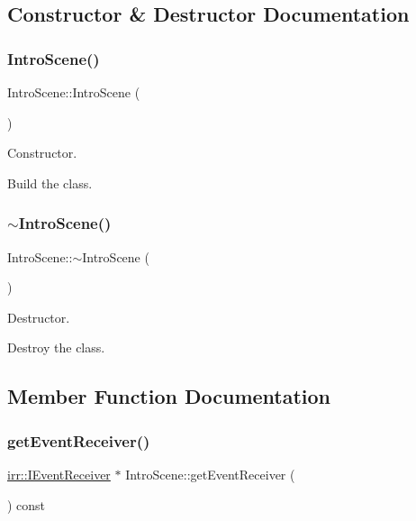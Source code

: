 \subsection{Constructor \& Destructor Documentation}
\mbox{\label{classIntroScene_a3691b51409f65b40f0c84008e49ef32b}} 
\subsubsection{\texorpdfstring{Intro\+Scene()}{IntroScene()}}
{\footnotesize\ttfamily Intro\+Scene\+::\+Intro\+Scene (\begin{DoxyParamCaption}{ }\end{DoxyParamCaption})}



Constructor. 

Build the class. \mbox{\label{classIntroScene_a7cdb50b55c0f5cf66b7bd151e4abe2b1}} 
\subsubsection{\texorpdfstring{$\sim$\+Intro\+Scene()}{~IntroScene()}}
{\footnotesize\ttfamily Intro\+Scene\+::$\sim$\+Intro\+Scene (\begin{DoxyParamCaption}{ }\end{DoxyParamCaption})}



Destructor. 

Destroy the class. 

\subsection{Member Function Documentation}
\mbox{\label{classIntroScene_acabf925dab7b2a346edd398445cd5800}} 
\subsubsection{\texorpdfstring{get\+Event\+Receiver()}{getEventReceiver()}}
{\footnotesize\ttfamily \hyperlink{classirr_1_1IEventReceiver}{irr\+::\+I\+Event\+Receiver} $\ast$ Intro\+Scene\+::get\+Event\+Receiver (\begin{DoxyParamCaption}{ }\end{DoxyParamCaption}) const\hspace{0.3cm}{\ttfamily [virtual]}}




